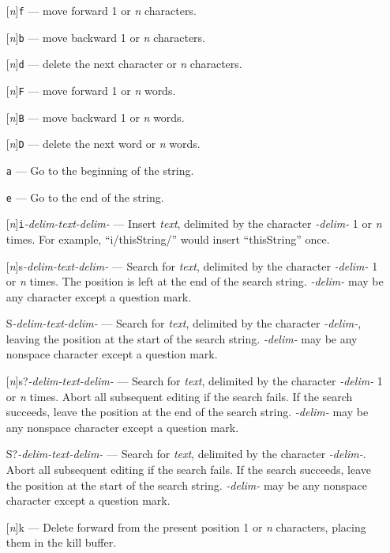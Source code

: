 \begin{itemize}
\item [] [{\em n}]{\tt f} --- move forward 1 or {\em n} characters.
\item [] [{\em n}]{\tt b} --- move backward 1 or {\em n} characters.
\item [] [{\em n}]{\tt d} --- delete the next character or {\em n} characters.
\item [] [{\em n}]{\tt F} --- move forward 1 or {\em n} words.
\item [] [{\em n}]{\tt B} --- move backward 1 or {\em n} words.
\item [] [{\em n}]{\tt D} --- delete the next word or {\em n} words.
\item [] {\tt a} --- Go to the beginning of the string.
\item [] {\tt e} --- Go to the end of the string.
\item [] [{\em n}]{\tt i}{\em -delim-}{\em text}{\em -delim-} --- Insert {\em text}, delimited
        by the character {\em -delim-} 1 or {\em n} times.  For example, ``i/thisString/'' would insert
        ``thisString'' once.
\item [] [{\em n}]s{\em -delim-}{\em text}{\em -delim-} --- Search for {\em text},  delimited
        by the character {\em -delim-} 1 or {\em n} times.  The position is left at the end
        of the search string.  {\em -delim-} may be any character except a question mark.
\item [] S{\em -delim-}{\em text}{\em -delim-} --- Search for {\em text},  delimited
        by the character {\em -delim-}, leaving the position at the start of the
        search string. {\em -delim-} may be any nonspace character except a question mark.
\item [] [{\em n}]s?{\em -delim-}{\em text}{\em -delim-} --- Search for {\em text},  delimited
         by the character {\em -delim-} 1 or {\em n} times.   Abort all subsequent editing
         if the search fails.  If the search succeeds, leave the position at the end of the
        search string. {\em -delim-} may be any nonspace character except a question mark.
\item [] S?{\em -delim-}{\em text}{\em -delim-} --- Search for {\em text},  delimited
         by the character {\em -delim-}.   Abort all subsequent editing
         if the search fails.  If the search succeeds, leave the position at the start of the
        search string. {\em -delim-} may be any nonspace character except a question mark.
\item [] [{\em n}]k --- Delete forward from the present position 1 or {\em n} characters, placing them in the kill buffer.

\end{itemize}

